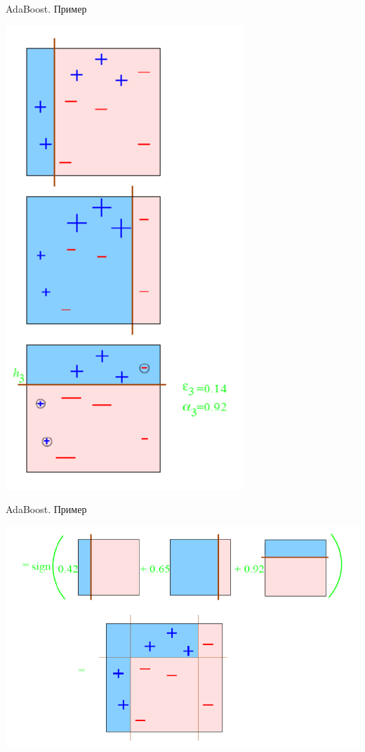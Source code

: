 \documentclass[10pt]{beamer}
\begin{document}
\begin{frame}{AdaBoost. Пример}
    \begin{center}
        \includegraphics[scale=0.3]{images/adaboost3.png}
    \end{center}
\end{frame}

\begin{frame}{AdaBoost. Пример}
    \begin{center}
        \includegraphics[scale=0.3]{images/adaboost4.png}
    \end{center}
\end{frame}
\end{document}
